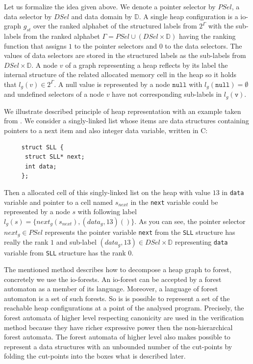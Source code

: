 Let us formalize the idea given above.
We denote a pointer selector by $PSel$, a data selector by $DSel$ and data domain by $\mathbb{D}$.
A single heap configuration is a io-graph $g_{st}$ over the ranked alphabet of the structured labels from $2^\Gamma$
with the sub-labels from the ranked alphabet $\Gamma = PSel \cup (DSel \times \mathbb{D})$ having the
ranking function that assigns $1$ to the pointer selectors and $0$ to the data selectors.
The values of data selectors are stored in the structured labels as the sub-labels from $DSel \times \mathbb{D}$.
A node $v$ of a graph representing a heap reflects by its label the internal structure of
the related allocated memory cell in the heap so it holds that $l_g(v) \in 2^\Gamma$.
A null value is represented by a node $\texttt{null}$ with $l_g(\texttt{null}) = \emptyset$
and undefined selectors of a node $v$ have not corresponding  sub-labels in $l_g(\texttt{v})$.

\bexmp
We illustrate described principle of heap representation with an example taken from \cite{techrep}.
We consider a singly-linked list whose items are data structures containing pointers to
a next item and also integer data variable, written in C:
\begin{center}
\begin{minipage}{0.3\textwidth}
    \begin{verbatim}
     struct SLL {
      struct SLL* next;
      int data;
     };
    \end{verbatim}
\end{minipage}
\end{center}
Then a allocated cell of this singly-linked list on the heap with value $13$ in \texttt{data} variable and pointer to a cell named $s_{next}$
in the \texttt{next} variable could be represented
by a node $s$ with following label $l_g(s) = \{next_g(s_{next}),(data_g,13)()\}$.
As you can see, the pointer selector $next_g \in PSel$ represents the pointer variable \texttt{next} from the \texttt{SLL} structure
has really the rank $1$ and sub-label $(data_g,13) \in DSel\times \mathbb{D}$ representing
\texttt{data} variable from \texttt{SLL} structure has the rank $0$.
\eexmp

The mentioned method describes how to decompose a heap graph to forest, concretely we use the io-forests.
An io-forest can be accepted by a forest automaton as a member of its language.
Moreover, a language of forest automaton is a set of such forests.
So is is possible to represent a set of the reachable heap configurations at a point of the analysed program.
Precisely, the forest automata of higher level respecting canonicity are used in the verification method
because they have richer expressive power then the non-hierarchical forest automata.
The forest automata of higher level also makes possible to represent
a data structures with an unbounded number of the cut-points by folding the cut-points
into the boxes what is described later.

